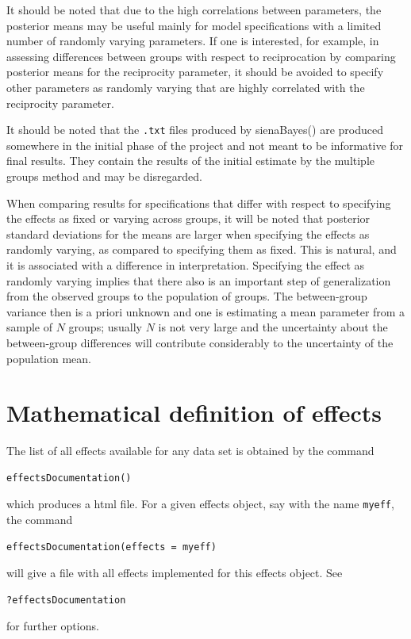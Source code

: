 \documentclass[a4paper,fleqn,11pt]{article}
\newcommand{\+}{\, + \,}
\newcommand{\sfn}[1]{\textsf{#1}}
\begin{document}
It should be noted that due to the high correlations between parameters,
the posterior means may be useful mainly for model specifications
with a limited number of randomly varying parameters.
If one is interested, for example, in assessing differences
between groups with respect to reciprocation by comparing
posterior means for the reciprocity parameter, it should be avoided
to specify other parameters as randomly varying that are
highly correlated with the reciprocity parameter.

It should be noted that the \texttt{.txt} files produced by \sfn{sienaBayes()}
are produced somewhere in the initial phase of the project and not meant
to be informative for final results. They contain the results of the
initial estimate by the multiple groups method and may be disregarded.
\medskip

When comparing results for specifications that differ with respect
to specifying the effects as fixed or varying across groups,
it will be noted that posterior standard deviations for the means
are larger when specifying the effects as randomly varying, as compared
to specifying them as fixed. This is natural, and it is associated
with a difference in interpretation.
Specifying the effect as randomly varying implies that there also is
an important step of generalization from the observed groups to the population
of groups. The between-group variance then is a priori unknown and one is
estimating a mean parameter from a sample of $N$ groups; usually $N$ is not
very large and the uncertainty about the between-group differences
will contribute considerably to the uncertainty of the population mean.

\newpage
\section[Formulas for effects]{Mathematical definition of effects}
\label{S_math}

The list of all effects available for any data set is obtained by
the command
\begin{verbatim}
effectsDocumentation()
\end{verbatim}
which produces a html file.
For a given effects object, say with the name \texttt{myeff}, the command
\begin{verbatim}
effectsDocumentation(effects = myeff)
\end{verbatim}
will give a file with all effects implemented for this effects object.
See
\begin{verbatim}
?effectsDocumentation
\end{verbatim}
for further options.
\bigskip
\end{document}
